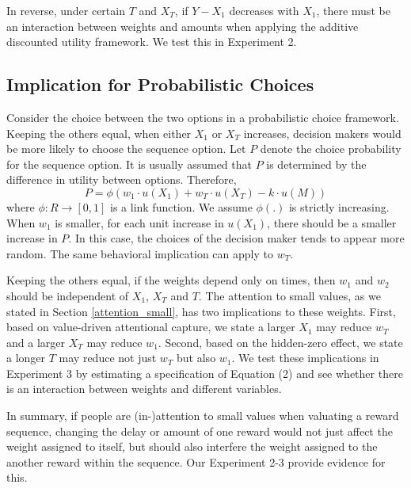 \documentclass[
  12pt,
]{article}
\begin{document}
In reverse, under certain \(T\) and \(X_T\), if \(Y-X_1\) decreases with
\(X_1\), there must be an interaction between weights and amounts when
applying the additive discounted utility framework. We test this in
Experiment 2.

\hypertarget{implication-for-probabilistic-choices}{%
\subsection{\texorpdfstring{Implication for Probabilistic Choices
\label{impli_prob_choice}}{Implication for Probabilistic Choices }}\label{implication-for-probabilistic-choices}}

Consider the choice between the two options in a probabilistic choice
framework. Keeping the others equal, when either \(X_1\) or \(X_T\)
increases, decision makers would be more likely to choose the sequence
option. Let \(P\) denote the choice probability for the sequence option.
It is usually assumed that \(P\) is determined by the difference in
utility between options. Therefore,\[
P = \phi(w_1\cdot u(X_1)+w_T\cdot u(X_T)-k\cdot u(M)) 
\]where \(\phi:R\rightarrow [0,1]\) is a link function. We assume
\(\phi(.)\) is strictly increasing. When \(w_1\) is smaller, for each
unit increase in \(u(X_1)\), there should be a smaller increase in
\(P\). In this case, the choices of the decision maker tends to appear
more random. The same behavioral implication can apply to \(w_T\).

Keeping the others equal, if the weights depend only on times, then
\(w_1\) and \(w_2\) should be independent of \(X_1\), \(X_T\) and \(T\).
The attention to small values, as we stated in Section
\ref{attention_small}, has two implications to these weights. First,
based on value-driven attentional capture, we state a larger \(X_1\) may
reduce \(w_T\) and a larger \(X_T\) may reduce \(w_1\). Second, based on
the hidden-zero effect, we state a longer \(T\) may reduce not just
\(w_T\) but also \(w_1\). We test these implications in Experiment 3 by
estimating a specification of Equation (2) and see whether there is an
interaction between weights and different variables.

In summary, if people are (in-)attention to small values when valuating
a reward sequence, changing the delay or amount of one reward would not
just affect the weight assigned to itself, but should also interfere the
weight assigned to the another reward within the sequence. Our
Experiment 2-3 provide evidence for this.
\end{document}
